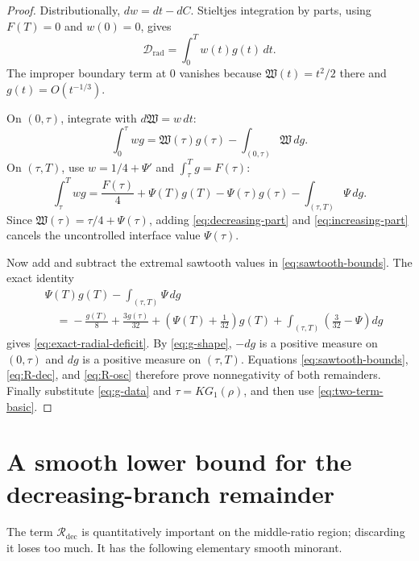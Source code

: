 \documentclass[11pt]{article}
\theoremstyle{remark}
\begin{document}
\begin{proof}
Distributionally, $dw=dt-dC$.  Stieltjes integration by parts, using
$F(T)=0$ and $w(0)=0$, gives
\begin{equation}
 \mathcal D_{\mathrm{rad}}=\int_0^T w(t)g(t)\,dt.
 \label{eq:radial-stieltjes}
\end{equation}
The improper boundary term at $0$ vanishes because
$\mathfrak W(t)=t^2/2$ there and $g(t)=O(t^{-1/3})$.

On $(0,\tau)$, integrate with $d\mathfrak W=w\,dt$:
\begin{equation}
 \int_0^\tau wg
 =\mathfrak W(\tau)g(\tau)
  -\int_{(0,\tau)}\mathfrak W\,dg.
 \label{eq:decreasing-part}
\end{equation}
On $(\tau,T)$, use $w=1/4+\Psi'$ and
$\int_\tau^Tg=F(\tau)$:
\begin{equation}
 \int_\tau^T wg
 =\frac{F(\tau)}4
  +\Psi(T)g(T)-\Psi(\tau)g(\tau)
  -\int_{(\tau,T)}\Psi\,dg.
 \label{eq:increasing-part}
\end{equation}
Since $\mathfrak W(\tau)=\tau/4+\Psi(\tau)$, adding
\eqref{eq:decreasing-part} and \eqref{eq:increasing-part} cancels the
uncontrolled interface value $\Psi(\tau)$.

Now add and subtract the extremal sawtooth values in
\eqref{eq:sawtooth-bounds}.  The exact identity
\begin{align*}
 &\Psi(T)g(T)-\int_{(\tau,T)}\Psi\,dg\\
 &\quad={}-\frac{g(T)}8+\frac{3g(\tau)}{32}
 +\left(\Psi(T)+\frac1{32}\right)g(T)
 +\int_{(\tau,T)}
     \left(\frac3{32}-\Psi\right)dg
\end{align*}
gives \eqref{eq:exact-radial-deficit}.  By
\eqref{eq:g-shape}, $-dg$ is a positive measure on $(0,\tau)$ and
$dg$ is a positive measure on $(\tau,T)$.  Equations
\eqref{eq:sawtooth-bounds}, \eqref{eq:R-dec}, and
\eqref{eq:R-osc} therefore prove nonnegativity of both remainders.
Finally substitute \eqref{eq:g-data} and $\tau=KG_1(\rho)$, and then use
\eqref{eq:two-term-basic}.
\end{proof}

\section{A smooth lower bound for the decreasing-branch remainder}

The term $\mathcal R_{\mathrm{dec}}$ is quantitatively important on the
middle-ratio region; discarding it loses too much.  It has the following
elementary smooth minorant.
\end{document}

